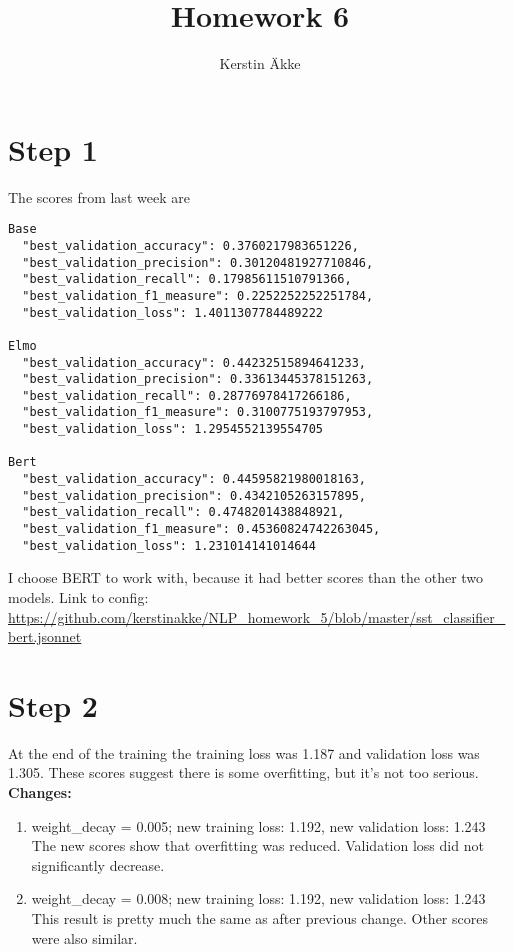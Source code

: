 \documentclass[11pt]{article} %
\title{Homework 6}
\author{Kerstin Äkke}
\begin{document}
\maketitle

\section*{Step 1}
The scores from last week are
\begin{verbatim}
Base
  "best_validation_accuracy": 0.3760217983651226,
  "best_validation_precision": 0.30120481927710846,
  "best_validation_recall": 0.17985611510791366,
  "best_validation_f1_measure": 0.2252252252251784,
  "best_validation_loss": 1.4011307784489222
  
Elmo
  "best_validation_accuracy": 0.44232515894641233,
  "best_validation_precision": 0.33613445378151263,
  "best_validation_recall": 0.28776978417266186,
  "best_validation_f1_measure": 0.3100775193797953,
  "best_validation_loss": 1.2954552139554705
  
Bert
  "best_validation_accuracy": 0.44595821980018163,
  "best_validation_precision": 0.4342105263157895,
  "best_validation_recall": 0.4748201438848921,
  "best_validation_f1_measure": 0.45360824742263045,
  "best_validation_loss": 1.231014141014644
\end{verbatim}
I choose BERT to work with, because it had better scores than the other two models. Link to config: \\\href{https://github.com/kerstinakke/NLP_homework_5/blob/master/sst_classifier_bert.jsonnet}{https://github.com/kerstinakke/NLP\_homework\_5/blob/master/sst\_classifier\_bert.jsonnet}

\section*{Step 2}

At the end of the training the training loss was 1.187 and validation loss was 1.305. These scores suggest there is some overfitting, but it's not too serious. 
\\\textbf{Changes:}
\begin{enumerate}  
\item weight\_decay = 0.005; new training loss: 1.192, new validation loss: 1.243
\\The new scores show that overfitting was reduced. Validation loss did not significantly decrease.
\item  weight\_decay = 0.008; new training loss: 1.192, new validation loss: 1.243
\\This result is pretty much the same as after previous change. Other scores were also similar.
\end{enumerate}
\end{document}
